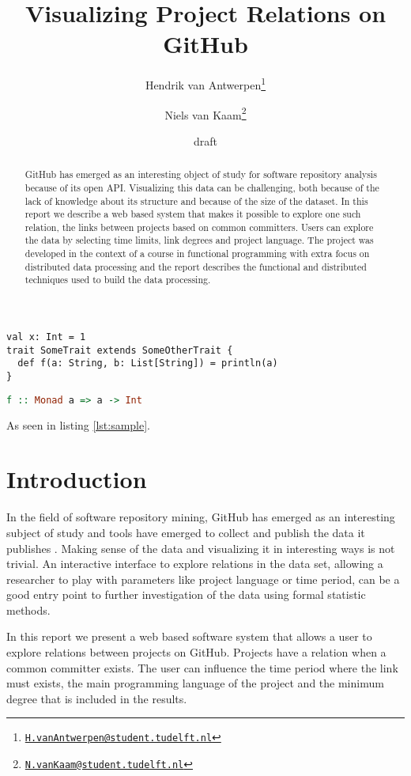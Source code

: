 \documentclass[10pt,a4paper]{article}
\title{Visualizing Project Relations on GitHub}
\author{
    Hendrik van Antwerpen\thanks{\href{mailto:H.vanAntwerpen@student.tudelft.nl}{\nolinkurl{H.vanAntwerpen@student.tudelft.nl}}}
  \and
    Niels van Kaam\thanks{\href{mailto:N.vanKaam@student.tudelft.nl}{\nolinkurl{N.vanKaam@student.tudelft.nl}}}
}
\date{draft}
\begin{document}
\maketitle

\begin{abstract}
GitHub has emerged as an interesting object of study for software repository analysis because of its open API. Visualizing this data can be challenging, both because of the lack of knowledge about its structure and because of the size of the dataset. In this report we describe a web based system that makes it possible to explore one such relation, the links between projects based on common committers. Users can explore the data by selecting time limits, link degrees and project language. The project was developed in the context of a course in functional programming with extra focus on distributed data processing and the report describes the functional and distributed techniques used to build the data processing.
\end{abstract}

\begin{lstlisting}[label=lst:sample,caption=Sample code]
val x: Int = 1
trait SomeTrait extends SomeOtherTrait {
  def f(a: String, b: List[String]) = println(a)
}
\end{lstlisting}

\begin{lstlisting}[language=haskell,caption=Haskell code]
f :: Monad a => a -> Int
\end{lstlisting}

As seen in listing \ref{lst:sample}.

\section{Introduction}

In the field of software repository mining, GitHub has emerged as an interesting subject of study and tools have emerged to collect and publish the data it publishes \citep{gousios2012ghtorrent}. Making sense of the data and visualizing it in interesting ways is not trivial. An interactive interface to explore relations in the data set, allowing a researcher to play with parameters like project language or time period, can be a good entry point to further investigation of the data using formal statistic methods.

In this report we present a web based software system that allows a user to explore relations between projects on GitHub. Projects have a relation when a common committer exists. The user can influence the time period where the link must exists, the main programming language of the project and the minimum degree that is included in the results.
\end{document}
